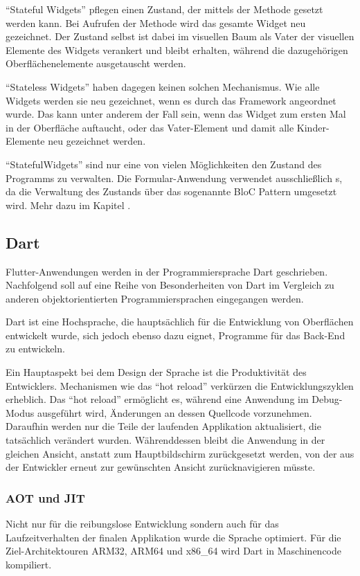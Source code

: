 \enquote{Stateful Widgets} pflegen einen Zustand, der mittels der Methode  gesetzt werden kann. Bei Aufrufen der Methode wird das gesamte Widget neu gezeichnet. Der Zustand selbst ist dabei im visuellen Baum als Vater der visuellen Elemente des Widgets verankert und bleibt erhalten, während die dazugehörigen Oberflächenelemente ausgetauscht werden.

\enquote{Stateless Widgets} haben dagegen keinen solchen Mechanismus. Wie alle Widgets werden sie neu gezeichnet, wenn es durch das Framework angeordnet wurde. Das kann unter anderem der Fall sein, wenn das Widget zum ersten Mal in der Oberfläche auftaucht, oder das Vater-Element und damit alle Kinder-Elemente neu gezeichnet werden.

\enquote{StatefulWidgets} sind nur eine von vielen Möglichkeiten den Zustand des Programms zu verwalten. Die Formular-Anwendung verwendet ausschließlich s, da die Verwaltung des Zustands über das sogenannte BloC Pattern umgesetzt wird. Mehr dazu im Kapitel .


\subsection{Dart}

Flutter-Anwendungen werden in der Programmiersprache Dart geschrieben. Nachfolgend soll auf eine Reihe von Besonderheiten von Dart im Vergleich zu anderen objektorientierten Programmiersprachen eingegangen werden.

Dart ist eine Hochsprache, die hauptsächlich für die Entwicklung von Oberflächen entwickelt wurde, sich jedoch ebenso dazu eignet, Programme für das Back-End zu entwickeln.

Ein Hauptaspekt bei dem Design der Sprache ist die Produktivität des Entwicklers. Mechanismen wie das \enquote{hot reload} verkürzen die Entwicklungszyklen erheblich. Das \enquote{hot reload} ermöglicht es, während eine Anwendung im Debug-Modus ausgeführt wird, Änderungen an dessen Quellcode vorzunehmen. Daraufhin werden nur die Teile der laufenden Applikation aktualisiert, die tatsächlich verändert wurden.  Währenddessen bleibt die Anwendung in der gleichen Ansicht, anstatt zum Hauptbildschirm zurückgesetzt werden, von der aus der Entwickler erneut zur gewünschten Ansicht zurücknavigieren müsste.

\subsubsection{AOT und JIT}
Nicht nur für die reibungslose Entwicklung sondern auch für das Laufzeitverhalten der finalen Applikation wurde die Sprache optimiert.
Für die Ziel-Architektouren ARM32, ARM64 und x86_64 wird Dart in Maschinencode kompiliert. 

